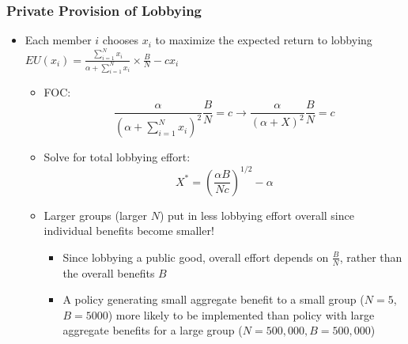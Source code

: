\documentclass{beamer}
\begin{document}
\begin{frame}
	\frametitle{Private Provision of Lobbying}
	\footnotesize
\begin{itemize}
	\footnotesize
	\item Each member $i$ chooses $x_i$ to maximize the expected return to lobbying $EU(x_i)=\frac{\sum^N_{i=1}x_i}{\alpha + \sum^N_{i=1}x_i}\times \frac{B}{N}-cx_i$
		\begin{itemize}
			\footnotesize
			\item FOC:
				\begin{equation}
				\frac{\alpha}{\left(\alpha+\sum^N_{i=1}x_i\right)^2}\frac{B}{N}=c \rightarrow 				\frac{\alpha}{\left(\alpha+X\right)^2}\frac{B}{N}=c\nonumber
				\end{equation} 

			\item Solve for total lobbying effort:
								\begin{equation}
								X^*=\left(\frac{\alpha B}{Nc}\right)^{1/2} - \alpha \nonumber
								\end{equation} 
			\item Larger groups (larger $N$) put in less lobbying effort overall since individual benefits become smaller!
				\begin{itemize}
					\footnotesize
					\item Since lobbying a public good, overall effort depends on $\frac{B}{N}$, rather than the overall benefits $B$
					\item A policy generating small aggregate benefit to a small group ($N=5$, $B=5000$) more likely to be implemented than policy with large aggregate benefits for a large group ($N=500,000, B=500,000$)
				\end{itemize}
		\end{itemize}
\end{itemize}
\end{frame}
\end{document}
